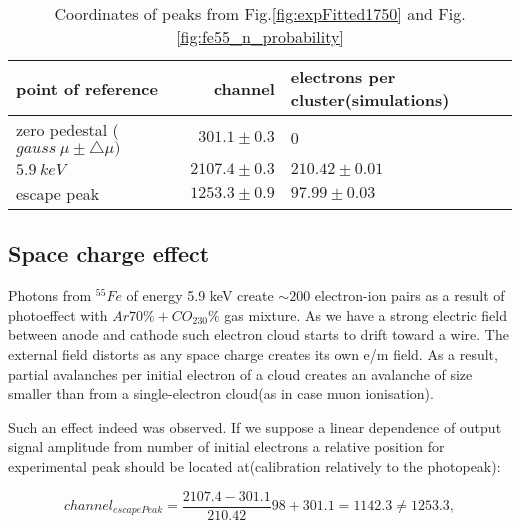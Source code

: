 	
	
	\begin{table}[!h]
	\centering
	\begin{tabular}{|l|r|l|}
		\hline
		point of reference & channel & electrons per cluster(simulations)\\
		\hline
		zero pedestal ($gauss~\mu \pm \bigtriangleup \mu)$ & $301.1 \pm 0.3 $ & 0\\
		\hline
		$5.9~keV$ & $2107.4 \pm 0.3$ & $210.42 \pm 0.01$ \\ 
		\hline
		escape peak & $1253.3 \pm 0.9 $ & $97.99 \pm 0.03$ \\
		\hline
	\end{tabular}
	\caption{ Coordinates of peaks from Fig.\ref{fig:expFitted1750} and Fig.\ref{fig:fe55_n_probability}}
	\label{table:peakPos}
	\end{table}
	
	\subsection{ Space charge effect}
	
	Photons from $^{55}Fe$ of energy 5.9 keV create $\sim 200$ electron-ion pairs as a result of photoeffect with $Ar70\%+CO_230\%$ gas mixture. As we have a strong electric field between anode and cathode such electron cloud starts to drift toward a wire. The external field distorts as any space charge creates its own e/m field. As a result, partial avalanches per initial electron of a cloud creates an avalanche of size smaller than from a single-electron cloud(as in case muon ionisation).
	
	Such an effect indeed was observed. If we suppose a linear dependence of output signal amplitude from number of initial electrons a relative position for experimental peak should be located at(calibration relatively to the photopeak):
	
	\begin{equation}
			channel_{escapePeak} = \frac{2107.4 - 301.1}{210.42} 98 + 301.1 = 1142.3 \ne 1253.3,
	\end{equation}
